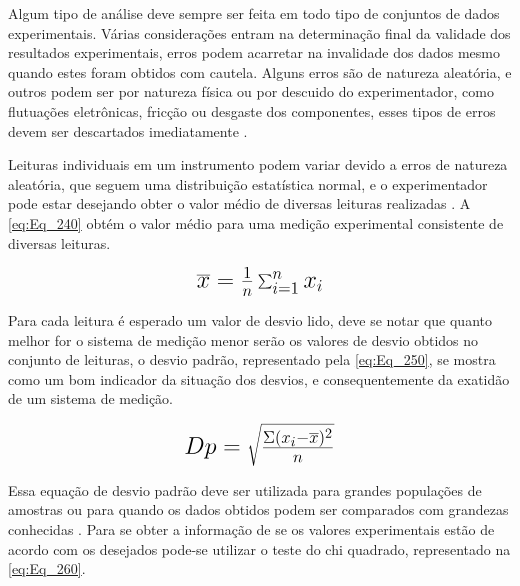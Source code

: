 Algum tipo de análise deve sempre ser feita em todo tipo de conjuntos de dados experimentais. Várias considerações entram na determinação final da validade dos resultados
experimentais, erros podem acarretar na invalidade dos dados mesmo quando estes foram obtidos com cautela. Alguns erros são de natureza aleatória, e outros podem ser por
natureza física ou por descuido do experimentador, como flutuações eletrônicas, fricção ou desgaste dos componentes, esses tipos de erros devem ser descartados imediatamente
\autocite{Hollman2011}.

Leituras individuais em um instrumento podem variar devido a erros de natureza aleatória, que seguem uma distribuição estatística normal, e o experimentador pode estar
desejando obter o valor médio de diversas leituras realizadas \autocite{Hollman2011}. A \autoref{eq:Eq_240} obtém o valor médio para uma medição experimental consistente
de diversas leituras.

\begin{equation}\label{eq:Eq_240}%
\mbox{\fontsize{17.28}{21.6}\selectfont\( %
\overline{x} = {\frac {1}{n}}\sum _{i=1}^{n}x_{i}
\)} %
\end{equation}

%
%
%

\hfill

Para cada leitura é esperado um valor de desvio lido, deve se notar que quanto melhor for o sistema de medição menor serão os valores de desvio obtidos no conjunto de
leituras, o desvio padrão, representado pela \autoref{eq:Eq_250}, se mostra como um bom indicador da situação dos desvios, e consequentemente da exatidão de um sistema de
medição.

\begin{equation}\label{eq:Eq_250}%
\mbox{\fontsize{17.28}{21.6}\selectfont\( %
Dp = \sqrt{\frac{\Sigma(x_i-\overline{x})^{2}}{n}}
\)} %
\end{equation}

%
%
%
%

\hfill

Essa equação de desvio padrão deve ser utilizada para grandes populações de amostras ou para quando os dados obtidos podem ser comparados com grandezas conhecidas \autocite{Hollman2011}.
Para se obter a informação de se os valores experimentais estão de acordo com os desejados pode-se utilizar o teste do chi quadrado, representado na \autoref{eq:Eq_260}.

